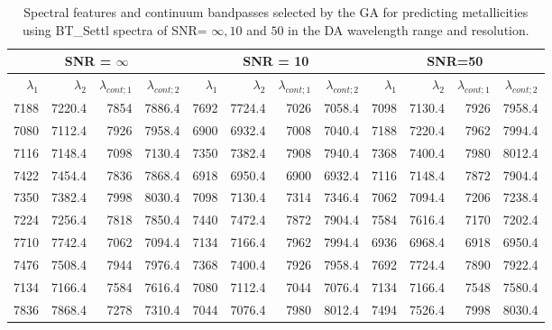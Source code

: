\begin{table*}
\begin{center}
\begin{tabular}{rrrr | rrrr | rrrr }
  \hline
 \multicolumn{4}{c}{SNR = $\infty $} & \multicolumn{4}{c}{SNR = 10} &  \multicolumn{4}{c}{SNR=50} \\
  \hline
$\lambda_1$ & $\lambda_2$ & $\lambda_{cont;1}$ & $\lambda_{cont;2} $ & $\lambda_1$ & $\lambda_2$ & $\lambda_{cont;1}$ & $\lambda_{cont;2} $ & $\lambda_1$ & $\lambda_2$ & $\lambda_{cont;1}$ & $\lambda_{cont;2} $ \\ 
  \hline
7188 & 7220.4 &	7854 & 7886.4 & 7692 & 7724.4 &	7026 & 7058.4  &  7098 & 7130.4 & 7926 & 7958.4 \\
7080 & 7112.4 &	7926 & 7958.4 & 6900 & 6932.4 &	7008 & 7040.4  &  7188 & 7220.4 & 7962 & 7994.4  \\
7116 & 7148.4 &	7098 & 7130.4 & 7350 & 7382.4 &	7908 & 7940.4  &  7368 & 7400.4 & 7980 & 8012.4  \\
7422 & 7454.4 &	7836 & 7868.4 & 6918 & 6950.4 &	6900 & 6932.4  &  7116 & 7148.4 & 7872 & 7904.4  \\
7350 & 7382.4 &	7998 & 8030.4 & 7098 & 7130.4 &	7314 & 7346.4  &  7062 & 7094.4 & 7206 & 7238.4  \\
7224 & 7256.4 &	7818 & 7850.4 & 7440 & 7472.4 &	7872 & 7904.4  &  7584 & 7616.4 & 7170 & 7202.4  \\
7710 & 7742.4 &	7062 & 7094.4 & 7134 & 7166.4 &	7962 & 7994.4  &  6936 & 6968.4 & 6918 & 6950.4  \\
7476 & 7508.4 &	7944 & 7976.4 & 7368 & 7400.4 &	7926 & 7958.4  &  7692 & 7724.4 & 7890 & 7922.4  \\
7134 & 7166.4 &	7584 & 7616.4 & 7080 & 7112.4 &	7044 & 7076.4  &  7134 & 7166.4 & 7548 & 7580.4  \\
7836 & 7868.4 &	7278 & 7310.4 & 7044 & 7076.4 &	7980 & 8012.4  &  7494 & 7526.4 & 7998 & 8030.4  \\
\hline
\end{tabular}
\caption {Spectral features and continuum bandpasses selected by the
  GA for predicting metallicities using BT\_Settl spectra of SNR= $\infty , 10 $
  and $ 50 $ in the DA wavelength range and
  resolution.} \label{tab:ipac-met-noisy}
\end{center}
\end{table*}


